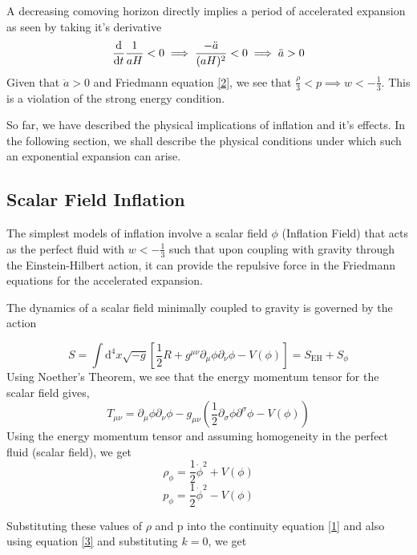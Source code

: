 \documentclass[aps,prd,reprint,preprintnumbers,showpacs,floatfix,nofootinbib,superscript address]{revtex4-2}
\begin{document}
A decreasing comoving horizon directly implies a period of accelerated expansion as seen by taking it's derivative
\begin{equation}
    \frac{\mathrm{d}}{\mathrm{d}t} \frac{1}{aH} <  0 \implies \frac{-\Ddot{a}}{(aH)^2} < 0 \implies \ddot{a} > 0
\end{equation}
Given that $\ddot{a} > 0$ and Friedmann equation \ref{2}, we see that $\frac{\rho}{3} < p \implies w < - \frac{1}{3}$. This is a violation of the strong energy condition.

So far, we have described the physical implications of inflation and it's effects. In the following section, we shall describe the physical conditions under which such an exponential expansion can arise. 

\subsection{Scalar Field Inflation}
The simplest models of inflation involve a scalar field $\phi$ (Inflation Field) that acts as the perfect fluid with $w < -\frac{1}{3}$ such that upon coupling with gravity through the Einstein-Hilbert action, it can provide the repulsive force in the Friedmann equations for the accelerated expansion.

The dynamics of a scalar field minimally coupled to gravity is governed by the action

\begin{equation}
    S = \int \mathrm{d}^4 x \sqrt{-g} \left[ \frac{1}{2} R + g^{\mu \nu}\partial_{\mu}\phi \partial_{\nu} \phi  - V(\phi) \right] = S_{\text{EH}} + S_{\phi}
\end{equation}
Using Noether's Theorem, we see that the energy momentum tensor for the scalar field gives,
\begin{equation}
    T_{\mu \nu} = \partial_{\mu} \phi \partial_{\nu} \phi - g_{\mu \nu} \left( \frac{1}{2}\partial_{\sigma} \phi \partial^{\sigma}\phi - V(\phi) \right)
\end{equation}
Using the energy momentum tensor and assuming homogeneity in the perfect fluid (scalar field), we get
\begin{equation}
    \rho_{\phi} = \frac{1}{2}{\dot{\phi}}^2 + V(\phi)
\end{equation}
\begin{equation}
    p_{\phi} = \frac{1}{2}{\dot{\phi}}^2 - V(\phi)    
\end{equation}

Substituting these values of $\rho$ and p into the continuity equation \ref{1} and also using equation \ref{3} and substituting $k = 0$, we get 
\end{document}
